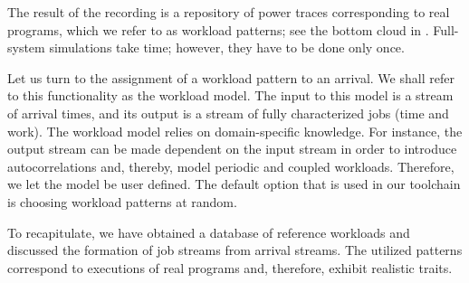The result of the recording is a repository of power traces corresponding to
real programs, which we refer to as workload patterns; see the bottom cloud in
. Full-system simulations take time; however, they have to be
done only once.

Let us turn to the assignment of a workload pattern to an arrival. We shall
refer to this functionality as the workload model. The input to this model is a
stream of arrival times, and its output is a stream of fully characterized jobs
(time and work). The workload model relies on domain-specific knowledge. For
instance, the output stream can be made dependent on the input stream in order
to introduce autocorrelations and, thereby, model periodic and coupled
workloads. Therefore, we let the model be user defined. The default option that
is used in our toolchain is choosing workload patterns at random.

To recapitulate, we have obtained a database of reference workloads and
discussed the formation of job streams from arrival streams. The utilized
patterns correspond to executions of real programs and, therefore, exhibit
realistic traits.
